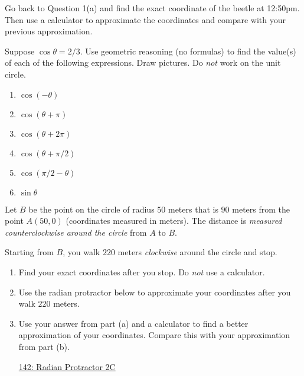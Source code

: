 \documentclass{ximera}
\begin{document}
\begin{question} \label{Q99f3332}
Go back to Question 1(a) and find the exact coordinate of the beetle at 12:50pm. Then use a calculator to approximate the coordinates and compare with your previous approximation.
\end{question}

\begin{question} \label{Q9df3rFDD}
Suppose $\cos\theta =2/3$. Use geometric reasoning (no formulas) to find the value(s) of each of the following expressions. Draw pictures. Do \emph{not} work on the unit circle.

\begin{enumerate}
\item $\cos(-\theta)$

\item $\cos(\theta+\pi)$

\item $\cos(\theta+2\pi)$

\item $\cos(\theta+\pi/2)$

\item  $\cos(\pi/2 - \theta)$

\item $\sin\theta$


\end{enumerate}
\end{question}








\begin{example}  \label{Exp89dsfrer94444}

Let $B$ be the point on the circle of radius $50$ meters that is $90$ meters from the point $A(50,0)$  (coordinates measured in meters). The distance is \emph{measured counterclockwise around the circle} from $A$ to $B$. 

Starting from $B$, you walk  $220$ meters \emph{clockwise} around the circle and stop.

\begin{enumerate}

\item Find your exact coordinates after you stop. Do \emph{not} use a calculator.

\item Use the radian protractor below to approximate your coordinates after you walk $220$ meters.
 
\item Use your answer from part (a) and a calculator to find a better approximation of your coordinates. Compare this with your approximation from part (b).

\begin{onlineOnly}
    \begin{center}
\end{center}
\end{onlineOnly}

\href{https://www.desmos.com/calculator/lbkveixdno}{142: Radian Protractor 2C}

\end{enumerate}
\end{example}
\end{document}

